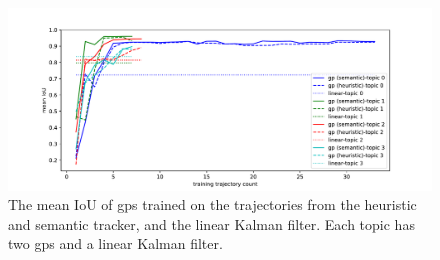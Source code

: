 \begin{figure}
\centering
    \includegraphics[width=\linewidth]{./img/gp/gp-iou.pdf}
    \caption{The mean IoU of \gls{gp}s trained on the trajectories from the heuristic and semantic tracker, and the linear Kalman filter. Each topic has two \gls{gp}s and a linear Kalman filter.}
    \label{fig:gp-iou}
\end{figure}